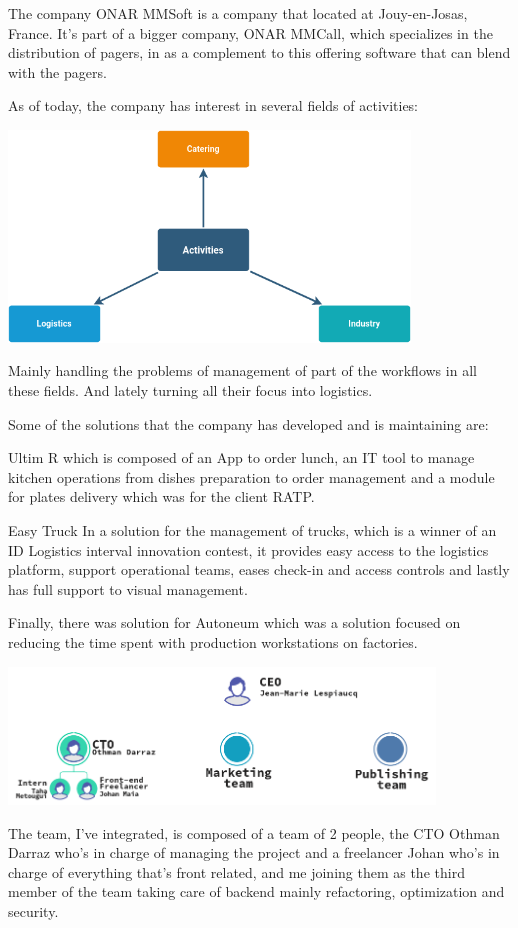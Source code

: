 The company ONAR MMSoft is a company that located at Jouy-en-Josas, France.
It's part of a bigger company, ONAR MMCall, which specializes in the distribution
of pagers, in as a complement to this offering software that can blend with the pagers.

As of today, the company has interest in several fields of activities:

\begin{center}
    \includegraphics[width=0.8\textwidth]{images/core_activities.png}
\end{center}

Mainly handling the problems of management of part of the workflows in all these fields. 
And lately turning all their focus into logistics.

Some of the solutions that the company has developed and is maintaining are:

Ultim R which is composed of an App to order lunch, an IT tool to manage kitchen operations
from dishes preparation to order management and a module for plates delivery which was for
the client RATP.

Easy Truck In a solution for the management of trucks, which is a winner of an ID Logistics
interval innovation contest, it provides easy access to the logistics platform, support
operational teams, eases check-in and access controls and lastly has full support to
visual management.

Finally, there was solution for Autoneum which was a solution focused on reducing the time
spent with production workstations on factories.

\begin{center}
    \includegraphics[width=0.85\textwidth]{images/Hierarchy}
\end{center}

The team, I've integrated, is composed of a team of 2 people, the CTO Othman Darraz who's
in charge of managing the project and a freelancer Johan who's in charge of everything that's
front related, and me joining them as the third member of the team taking care of backend
mainly refactoring, optimization and security.


